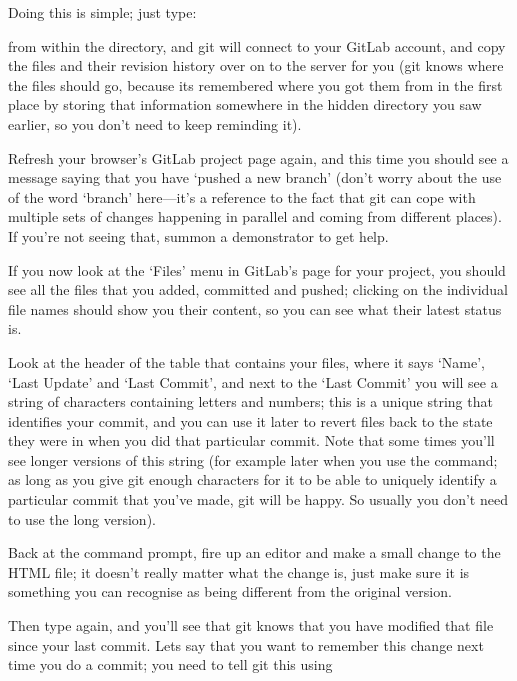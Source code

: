 Doing this is simple; just type:


from within the  directory, and git will connect to your GitLab account, and copy the files and their revision history over on to the server for you (git knows where the files should go, because its remembered where you got them from in the first place by storing that information somewhere in the hidden  directory you saw earlier, so you don't need to keep reminding it). 

Refresh your browser's GitLab project page again, and this time you should see a message saying that you have `pushed a new branch' (don't worry about the use of the word `branch' here---it's a reference to the fact that git can cope with multiple sets of changes happening in parallel and coming from different places). If you're not seeing that, summon a demonstrator to get help. 

If you now look at the `Files' menu in GitLab's page for your  project, you should see all the files that you added, committed and pushed; clicking on the individual file names should show you their content, so you can see what their latest status is. 

Look at the header of the table that contains your files, where it says `Name', `Last Update' and `Last Commit', and next to the `Last Commit' you will see a string of characters containing letters and numbers; this is a unique string that identifies your commit, and you can use it later to revert files back to the state they were in when you did that particular commit. Note that some times you'll see longer versions of this string (for example later when you use the  command; as long as you give git enough characters for it to be able to uniquely identify a particular commit that you've made, git will be happy. So usually you don't need to use the long version).

Back at the command prompt, fire up an editor and make a small change to the HTML file; it doesn't really matter what the change is, just make sure it is something you can recognise as being different from the original version.

Then type  again, and you'll see that git knows that you have modified that file since your last commit. Lets say that you want to remember this change next time you do a commit; you need to tell git this using 

